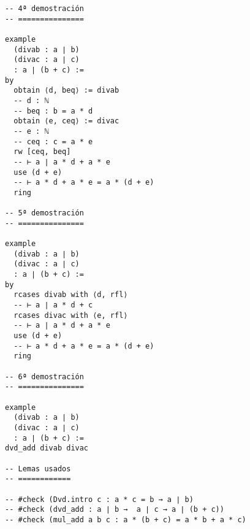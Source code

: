 \begin{verbatim}
-- 4ª demostración
-- ===============

example
  (divab : a ∣ b)
  (divac : a ∣ c)
  : a ∣ (b + c) :=
by
  obtain ⟨d, beq⟩ := divab
  -- d : ℕ
  -- beq : b = a * d
  obtain ⟨e, ceq⟩ := divac
  -- e : ℕ
  -- ceq : c = a * e
  rw [ceq, beq]
  -- ⊢ a ∣ a * d + a * e
  use (d + e)
  -- ⊢ a * d + a * e = a * (d + e)
  ring

-- 5ª demostración
-- ===============

example
  (divab : a ∣ b)
  (divac : a ∣ c)
  : a ∣ (b + c) :=
by
  rcases divab with ⟨d, rfl⟩
  -- ⊢ a ∣ a * d + c
  rcases divac with ⟨e, rfl⟩
  -- ⊢ a ∣ a * d + a * e
  use (d + e)
  -- ⊢ a * d + a * e = a * (d + e)
  ring

-- 6ª demostración
-- ===============

example
  (divab : a ∣ b)
  (divac : a ∣ c)
  : a ∣ (b + c) :=
dvd_add divab divac

-- Lemas usados
-- ============

-- #check (Dvd.intro c : a * c = b → a ∣ b)
-- #check (dvd_add : a ∣ b →  a ∣ c → a ∣ (b + c))
-- #check (mul_add a b c : a * (b + c) = a * b + a * c)
\end{verbatim}

